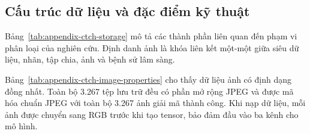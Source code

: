 \subsection{Cấu trúc dữ liệu và đặc điểm kỹ thuật}

Bảng~\ref{tab:appendix-ctch-storage} mô tả các thành phần liên quan đến phạm vi phân loại của nghiên cứu. Định danh ảnh là khóa liên kết một-một giữa siêu dữ liệu, nhãn, tập chia, ảnh và bệnh sử lâm sàng.

\begin{table}[H]
\centering
{}
\caption{Cấu trúc lưu trữ của bộ dữ liệu CTCH trong nghiên cứu}
\label{tab:appendix-ctch-storage}
\end{table}

Bảng~\ref{tab:appendix-ctch-image-properties} cho thấy dữ liệu ảnh có định dạng đồng nhất. Toàn bộ 3.267 tệp lưu trữ đều có phần mở rộng JPEG và được mã hóa chuẩn JPEG với toàn bộ 3.267 ảnh giải mã thành công. Khi nạp dữ liệu, mỗi ảnh được chuyển sang RGB trước khi tạo tensor, bảo đảm đầu vào ba kênh cho mô hình.

